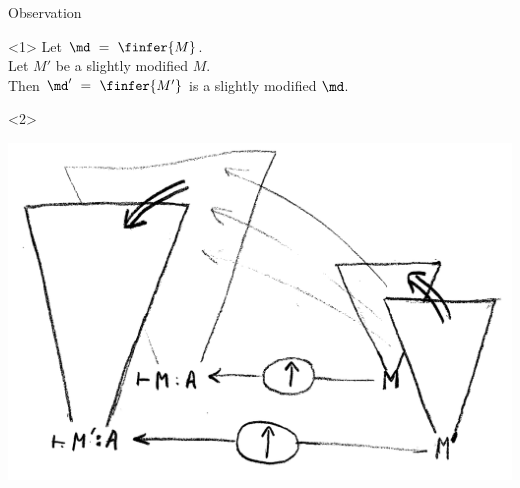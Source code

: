 \begin{frame}{Observation}

  \begin{onlyenv}<1>
    Let $\md\ =\ \finfer{M}$. \\
    Let $M'$ be a slightly modified $M$. \\
    Then $\md'\ =\ \finfer{M'}$ is a slightly modified $\md$.
  \end{onlyenv}

  \begin{onlyenv}<2>
    \begin{center}
      \includegraphics{images/deriv.png}
    \end{center}
  \end{onlyenv}
\end{frame}

